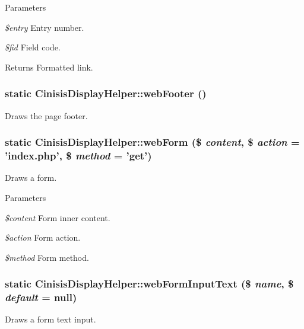 \begin{DoxyParams}{Parameters}
\item[{\em \$entry}]Entry number.\item[{\em \$fid}]Field code.\end{DoxyParams}
\begin{DoxyReturn}{Returns}
Formatted link. 
\end{DoxyReturn}
\hypertarget{classCinisisDisplayHelper_aa331cd95a86ffd270784736e74f253e6}{
\subsubsection[{webFooter}]{\setlength{\rightskip}{0pt plus 5cm}static CinisisDisplayHelper::webFooter ()}}
\label{classCinisisDisplayHelper_aa331cd95a86ffd270784736e74f253e6}
Draws the page footer. \hypertarget{classCinisisDisplayHelper_a7ba5dd0ddd1ba9de5efdbfa1b62d4efa}{
\subsubsection[{webForm}]{\setlength{\rightskip}{0pt plus 5cm}static CinisisDisplayHelper::webForm (\$ {\em content}, \/  \$ {\em action} = {\ttfamily 'index.php'}, \/  \$ {\em method} = {\ttfamily 'get'})}}
\label{classCinisisDisplayHelper_a7ba5dd0ddd1ba9de5efdbfa1b62d4efa}
Draws a form.


\begin{DoxyParams}{Parameters}
\item[{\em \$content}]Form inner content.\item[{\em \$action}]Form action.\item[{\em \$method}]Form method. \end{DoxyParams}
\hypertarget{classCinisisDisplayHelper_a4c8934dc88cda9c7a894106b4dc7abba}{
\subsubsection[{webFormInputText}]{\setlength{\rightskip}{0pt plus 5cm}static CinisisDisplayHelper::webFormInputText (\$ {\em name}, \/  \$ {\em default} = {\ttfamily null})}}
\label{classCinisisDisplayHelper_a4c8934dc88cda9c7a894106b4dc7abba}
Draws a form text input.


